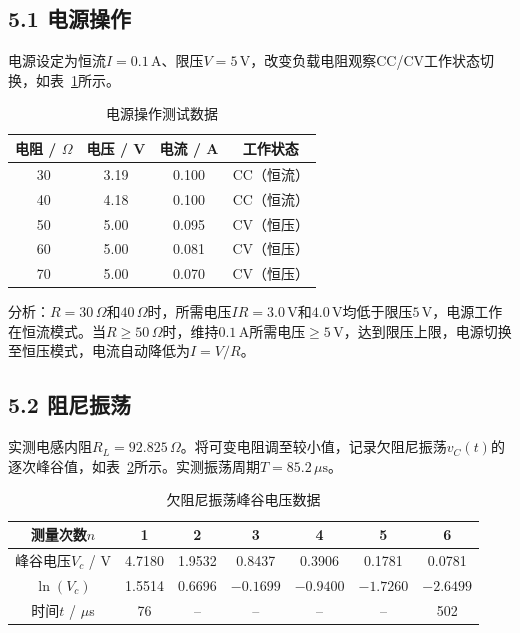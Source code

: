 \documentclass[12pt, a4paper]{article}
\begin{document}
\subsection*{5.1 电源操作}

电源设定为恒流$I = 0.1\,\mathrm{A}$、限压$V = 5\,\mathrm{V}$，改变负载电阻观察CC/CV工作状态切换，如表~\ref{tab:power}所示。

\begin{table}[H]
\centering
\caption{电源操作测试数据}
\label{tab:power}
\begin{tabular}{cccc}
\toprule
电阻 / $\Omega$ & 电压 / V & 电流 / A & 工作状态 \\
\midrule
30 & 3.19 & 0.100 & CC（恒流） \\
40 & 4.18 & 0.100 & CC（恒流） \\
50 & 5.00 & 0.095 & CV（恒压） \\
60 & 5.00 & 0.081 & CV（恒压） \\
70 & 5.00 & 0.070 & CV（恒压） \\
\bottomrule
\end{tabular}
\end{table}

分析：$R = 30\,\Omega$和$40\,\Omega$时，所需电压$IR = 3.0\,\mathrm{V}$和$4.0\,\mathrm{V}$均低于限压$5\,\mathrm{V}$，电源工作在恒流模式。当$R \geq 50\,\Omega$时，维持$0.1\,\mathrm{A}$所需电压$\geq 5\,\mathrm{V}$，达到限压上限，电源切换至恒压模式，电流自动降低为$I = V/R$。

\subsection*{5.2 阻尼振荡}

实测电感内阻$R_L = 92.825\,\Omega$。将可变电阻调至较小值，记录欠阻尼振荡$v_C(t)$的逐次峰谷值，如表~\ref{tab:damping}所示。实测振荡周期$T = 85.2\,\mu\mathrm{s}$。

\begin{table}[H]
\centering
\caption{欠阻尼振荡峰谷电压数据}
\label{tab:damping}
\begin{tabular}{ccccccc}
\toprule
测量次数$n$ & 1 & 2 & 3 & 4 & 5 & 6 \\
\midrule
峰谷电压$V_c$ / V & 4.7180 & 1.9532 & 0.8437 & 0.3906 & 0.1781 & 0.0781 \\
$\ln(V_c)$ & 1.5514 & 0.6696 & $-0.1699$ & $-0.9400$ & $-1.7260$ & $-2.6499$ \\
时间$t$ / $\mu$s & 76 & -- & -- & -- & -- & 502 \\
\bottomrule
\end{tabular}
\end{table}
\end{document}
